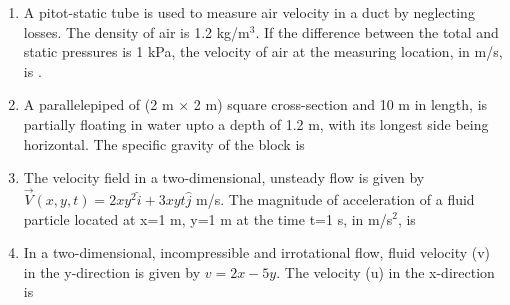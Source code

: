 \documentclass[a4paper,10pt]{article}
\begin{document}
\begin{enumerate}
    \item A pitot-static tube is used to measure air velocity in a duct by neglecting losses. The density of air is 1.2 kg/m$^3$. If the difference between the total and static pressures is 1 kPa, the velocity of air at the measuring location, in m/s, is \underline{\hspace{2cm}}.
    \hfill{}

    \item A parallelepiped of (2 m $\times$ 2 m) square cross-section and 10 m in length, is partially floating in water upto a depth of 1.2 m, with its longest side being horizontal. The specific gravity of the block is
    \hfill{}
    \begin{enumerate}[label=\Alph*)]
    \end{enumerate}

    \item The velocity field in a two-dimensional, unsteady flow is given by $\vec{V}(x,y,t) = 2xy^2\hat{i} + 3xyt\hat{j}$ m/s. The magnitude of acceleration of a fluid particle located at x=1 m, y=1 m at the time t=1 s, in m/s$^2$, is
    \hfill{}
    \begin{enumerate}[label=\Alph*)]
    \end{enumerate}

    \item In a two-dimensional, incompressible and irrotational flow, fluid velocity (v) in the y-direction is given by $v = 2x - 5y$. The velocity (u) in the x-direction is
    \hfill{}
    \begin{enumerate}[label=\Alph*)]
    \end{enumerate}


\end{enumerate}
\end{document}
